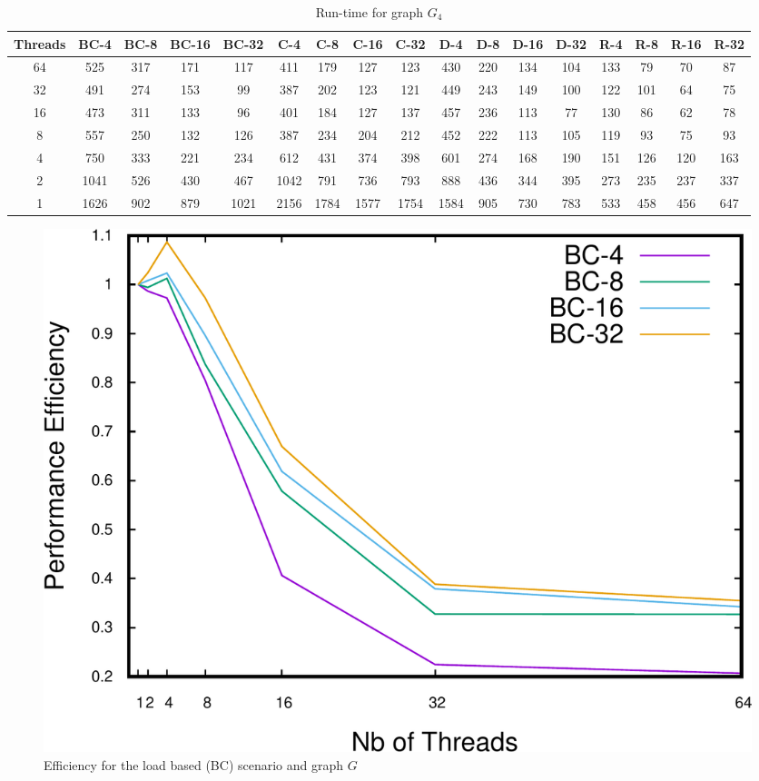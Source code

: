 \begin{table}[t]
\begin{minipage}[b]{\textwidth}
\caption{Run-time  for graph $G_4$}
\label{tab:graph4}
{\small
\begin{tabular}{||c||c|c|c|c||c|c|c|c||c|c|c|c||c|c|c|c|}
\hline
\textbf{Threads}	&\cellcolor{black!10}BC-4&	\cellcolor{black!10}BC-8	&\cellcolor{black!10}BC-16	&\cellcolor{black!10}BC-32&	\cellcolor{black!10}C-4	&\cellcolor{black!10}C-8&	\cellcolor{black!10}C-16&	\cellcolor{black!10}C-32&	\cellcolor{black!10}D-4&	\cellcolor{black!10}D-8	&\cellcolor{black!10}D-16&\cellcolor{black!10}	D-32&	\cellcolor{black!10}R-4	&\cellcolor{black!10}R-8&	\cellcolor{black!10}R-16&	\cellcolor{black!10}R-32 \\ \hline \hline
64 &		525&	317	&171&	117	&411	&179&	127	&123	&430	&220	&134	&104&	133&	79&	70	&87	 \\ \hline		
32	&	491&	274	&153	&99	&387	&202	&123	&121 &449	&243&	149&	100	&122	&101&	64&	75\\ \hline
16	&	473	&311	&133	&96	&401	&184	&127	&137 &457	&236	&113	&77	&130	&86	&62	&78 \\ \hline
8	&	557&	250	&132	&126	&387	&234	&204	&212 &452	&222	&113	&105	&119&	93	&75	&93 \\ \hline
4		&750&	333	&221	&234	&612	&431	&374	&398 &601	&274 &168	&190	&151	&126&	120	&163 \\ \hline
2		&1041 &526 &430 &467	&1042	&791	&736	&793 &888	&436	&344	&395	&273	&235	&237	&337 \\ \hline
1		&1626&902&879 &1021 &2156 &1784 &1577 &1754 &1584 &905 &730 &783& 533 &458 &456 &647 \\ \hline
\end{tabular}
}
\end{minipage}
\end{table}

\begin{figure}
\centering
\includegraphics[scale=0.35]{bench/generated/efficiency-bc-1-crop.pdf}
\caption{Efficiency for the load based (BC) scenario and graph $G$}
\label{fig:effbc1}
\end{figure}

